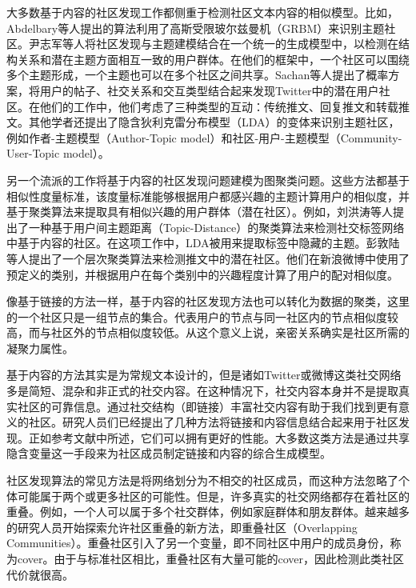 大多数基于内容的社区发现工作都侧重于检测社区文本内容的相似模型。比如，Abdelbary等人提出的算法\cite{Abdelbary2014Utilizing}利用了高斯受限玻尔兹曼机（GRBM）来识别主题社区。尹志军等人\cite{Yin2012Latent}将社区发现与主题建模结合在一个统一的生成模型中，以检测在结构关系和潜在主题方面相互一致的用户群体。在他们的框架中，一个社区可以围绕多个主题形成，一个主题也可以在多个社区之间共享。Sachan等人\cite{Sachan2012Using}提出了概率方案，将用户的帖子、社交关系和交互类型结合起来发现Twitter中的潜在用户社区。在他们的工作中，他们考虑了三种类型的互动：传统推文、回复推文和转载推文。其他学者还提出了隐含狄利克雷分布模型（LDA）的变体来识别主题社区，例如作者-主题模型（Author-Topic model）\cite{RosenZvi2012The}和社区-用户-主题模型（Community-User-Topic model）\cite{Zhou2006Probabilistic}。

另一个流派的工作将基于内容的社区发现问题建模为图聚类问题。这些方法都基于相似性度量标准，该度量标准能够根据用户都感兴趣的主题计算用户的相似度，并基于聚类算法来提取具有相似兴趣的用户群体（潜在社区）。例如，刘洪涛等人\cite{Liu2014Community}提出了一种基于用户间主题距离（Topic-Distance）的聚类算法来检测社交标签网络中基于内容的社区。在这项工作中，LDA被用来提取标签中隐藏的主题。彭敦陆等人\cite{Peng2015DICH}提出了一个层次聚类算法来检测推文中的潜在社区。他们在新浪微博中使用了预定义的类别，并根据用户在每个类别中的兴趣程度计算了用户的配对相似度。

像基于链接的方法一样，基于内容的社区发现方法也可以转化为数据的聚类，这里的一个社区只是一组节点的集合。代表用户的节点与同一社区内的节点相似度较高，而与社区外的节点相似度较低。从这个意义上说，亲密关系确实是社区所需的凝聚力属性。

基于内容的方法其实是为常规文本设计的，但是诸如Twitter或微博这类社交网络多是简短、混杂和非正式的社交内容。在这种情况下，社交内容本身并不是提取真实社区的可靠信息\cite{Yang2009Combining}。通过社交结构（即链接）丰富社交内容有助于我们找到更有意义的社区。研究人员们已经提出了几种方法将链接和内容信息结合起来用于社区发现。正如参考文献\cite{Cohn2001The,Getoor2003Learning}中所述，它们可以拥有更好的性能。大多数这类方法是通过共享隐含变量这一手段来为社区成员制定链接和内容的综合生成模型。

社区发现算法的常见方法是将网络划分为不相交的社区成员，而这种方法忽略了个体可能属于两个或更多社区的可能性。但是，许多真实的社交网络都存在着社区的重叠\cite{Xie2013Overlapping}。例如，一个人可以属于多个社交群体，例如家庭群体和朋友群体。越来越多的研究人员开始探索允许社区重叠的新方法，即重叠社区（Overlapping Communities）。重叠社区引入了另一个变量，即不同社区中用户的成员身份，称为cover。由于与标准社区相比，重叠社区有大量可能的cover，因此检测此类社区代价就很高。

